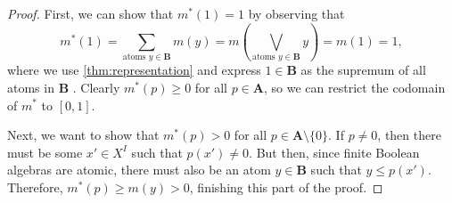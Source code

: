 \documentclass{article}
\theoremstyle{definition}
\theoremstyle{remark}
\begin{document}
\begin{proof} %
  First, we can show that $m^*(1) = 1$ by observing that
  \[
    m^*(1) = \sum_{\text{atoms } y \in \mathbf{B}} m(y) = m \left(
      \bigvee_{\text{atoms } y \in \mathbf{B}} y \right) = m(1) = 1,
  \]
  where we use \cref{thm:representation} and express $1 \in \mathbf{B}$ as the
  supremum of all atoms in $\mathbf{B}$ \cite{ganesh2006introduction}. Clearly
  $m^*(p) \ge 0$ for all $p \in \mathbf{A}$, so we can restrict the codomain of
  $m^*$ to $[0, 1]$.

  Next, we want to show that $m^*(p) > 0$ for all $p \in \mathbf{A} \setminus \{
  0 \}$. If $p \ne 0$, then there must be some $x' \in X^I$ such that $p(x') \ne
  0$. But then, since finite Boolean algebras are atomic, there must also be an
  atom $y \in \mathbf{B}$ such that $y \le p(x')$. Therefore, $m^*(p) \ge m(y) >
  0$, finishing this part of the proof.


\end{proof}
\end{document}
